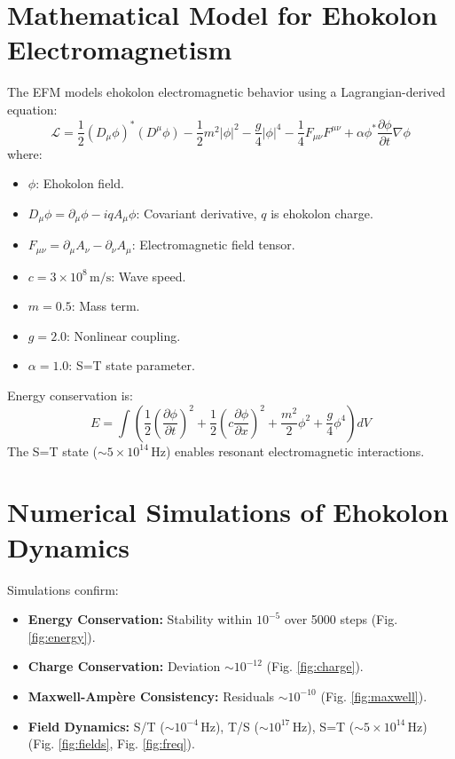 \documentclass{article}
\begin{document}
\section{Mathematical Model for Ehokolon Electromagnetism}
The EFM models ehokolon electromagnetic behavior using a Lagrangian-derived equation:
\begin{equation}
\mathcal{L} = \frac{1}{2} (D_\mu \phi)^* (D^\mu \phi) - \frac{1}{2} m^2 |\phi|^2 - \frac{g}{4} |\phi|^4 - \frac{1}{4} F_{\mu \nu} F^{\mu \nu} + \alpha \phi^* \frac{\partial \phi}{\partial t} \nabla \phi
\end{equation}
where:
\begin{itemize}
    \item \(\phi\): Ehokolon field.
    \item \(D_\mu \phi = \partial_\mu \phi - i q A_\mu \phi\): Covariant derivative, \(q\) is ehokolon charge.
    \item \(F_{\mu \nu} = \partial_\mu A_\nu - \partial_\nu A_\mu\): Electromagnetic field tensor.
    \item \(c = 3 \times 10^8 \, \text{m/s}\): Wave speed.
    \item \(m = 0.5\): Mass term.
    \item \(g = 2.0\): Nonlinear coupling.
    \item \(\alpha = 1.0\): S=T state parameter.
\end{itemize}
Energy conservation is:
\begin{equation}
E = \int \left( \frac{1}{2} \left(\frac{\partial \phi}{\partial t}\right)^2 + \frac{1}{2} \left(c \frac{\partial \phi}{\partial x}\right)^2 + \frac{m^2}{2} \phi^2 + \frac{g}{4} \phi^4 \right) dV
\end{equation}
The S=T state (\(\sim 5 \times 10^{14} \, \text{Hz}\)) enables resonant electromagnetic interactions.

\section{Numerical Simulations of Ehokolon Dynamics}
Simulations confirm:
\begin{itemize}
    \item \textbf{Energy Conservation:} Stability within \(10^{-5}\) over 5000 steps (Fig. \ref{fig:energy}).
    \item \textbf{Charge Conservation:} Deviation \(\sim 10^{-12}\) (Fig. \ref{fig:charge}).
    \item \textbf{Maxwell-Ampère Consistency:} Residuals \(\sim 10^{-10}\) (Fig. \ref{fig:maxwell}).
    \item \textbf{Field Dynamics:} S/T (\(\sim 10^{-4} \, \text{Hz}\)), T/S (\(\sim 10^{17} \, \text{Hz}\)), S=T (\(\sim 5 \times 10^{14} \, \text{Hz}\)) (Fig. \ref{fig:fields}, Fig. \ref{fig:freq}).
\end{itemize}
\end{document}

